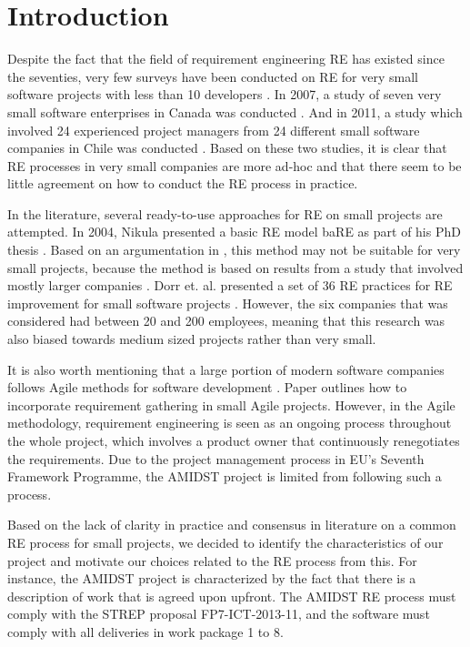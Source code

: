 \section{Introduction}

Despite the fact that the field of requirement engineering RE has existed since the seventies, very few surveys have been conducted on RE for very small software projects with less than 10 developers \cite{Qui10}. In 2007, a study of seven very small software enterprises in Canada was conducted \cite{Ara07}.
And in 2011, a study which involved 24 experienced project managers from 24 different small software companies in Chile was conducted \cite{Qui10}.  Based on these two studies, it is clear that RE processes in very small companies are more ad-hoc and that there seem to be little agreement on how to conduct the RE process in practice.



In the literature, several ready-to-use approaches for RE on small projects are attempted.  In 2004, Nikula presented a basic RE model baRE as part of his PhD thesis \cite{Nik04}.  Based on an argumentation in \cite{Qui10}, this method may not be suitable for very small projects, because the method is based on results from a study that involved mostly larger companies \cite{Nik00}.   Dorr et. al. presented a set of 36 RE practices for RE improvement for small software projects \cite{Dor08}.  However, the six companies that was considered had between 20 and 200 employees, meaning that this research was also biased towards medium sized projects rather than very small. 

It is also worth mentioning that a large portion of modern software companies follows Agile methods for software development \cite{Din10}.  Paper \cite{Kav11} outlines how to incorporate requirement gathering in small Agile projects.  However, in the Agile methodology, requirement engineering is seen as an ongoing process throughout the whole project, which involves a product owner that continuously renegotiates the requirements.  Due to the project management process in EU's Seventh Framework Programme, the AMIDST project is limited from following such a process. 

Based on the lack of clarity in practice and consensus in literature on a common RE process for small projects, we decided to identify the characteristics of our project and motivate our choices related to the RE process from this.  For instance, the AMIDST project is characterized by the fact that there is a description of work that is agreed upon upfront.  The 
AMIDST RE process must comply with the STREP proposal FP7-ICT-2013-11, and the software must comply with all deliveries in work package 1 to 8. 

